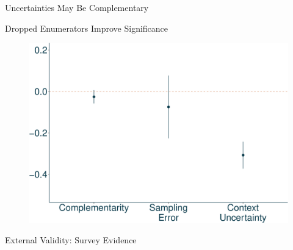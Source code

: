 \documentclass[
  ignorenonframetext,
]{beamer}
\begin{document}
\begin{frame}{Uncertainties May Be Complementary}
\begin{block}{Dropped Enumerators Improve Significance}
\begin{figure}
{\centering \includegraphics{presentation_lori_files/figure-beamer/unnamed-chunk-6-1.pdf}

}

\end{figure}
\end{block}
\end{frame}

\begin{frame}{External Validity: Survey Evidence}
\protect\hypertarget{external-validity-survey-evidence}{}
\end{frame}
\end{document}
